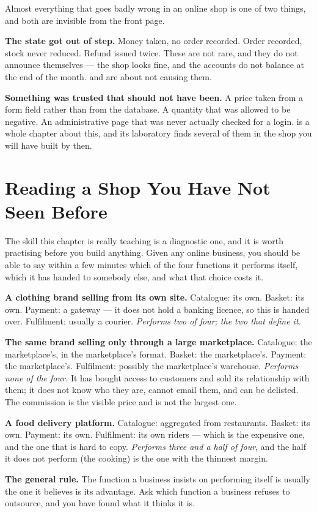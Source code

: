 \begin{alertbox}
Almost everything that goes badly wrong in an online shop is one of two things,
and both are invisible from the front page.

\smallskip
\textbf{The state got out of step.} Money taken, no order recorded. Order
recorded, stock never reduced. Refund issued twice. These are not rare, and they
do not announce themselves --- the shop looks fine, and the accounts do not
balance at the end of the month.  and  are about
not causing them.

\smallskip
\textbf{Something was trusted that should not have been.} A price taken from a
form field rather than from the database. A quantity that was allowed to be
negative. An administrative page that was never actually checked for a login.
 is a whole chapter about this, and its laboratory finds several
of them in the shop you will have built by then.
\end{alertbox}

\section{Reading a Shop You Have Not Seen Before}

The skill this chapter is really teaching is a diagnostic one, and it is worth
practising before you build anything. Given any online business, you should be
able to say within a few minutes which of the four functions it performs itself,
which it has handed to somebody else, and what that choice costs it.

\begin{worked}
\textbf{A clothing brand selling from its own site.}
Catalogue: its own. Basket: its own. Payment: a gateway --- it does not hold a
banking licence, so this is handed over. Fulfilment: usually a courier.
\emph{Performs two of four; the two that define it.}

\smallskip
\textbf{The same brand selling only through a large marketplace.}
Catalogue: the marketplace's, in the marketplace's format. Basket: the
marketplace's. Payment: the marketplace's. Fulfilment: possibly the
marketplace's warehouse. \emph{Performs none of the four.} It has bought
access to customers and sold its relationship with them; it does not know who
they are, cannot email them, and can be delisted. The commission is the
visible price and is not the largest one.

\smallskip
\textbf{A food delivery platform.}
Catalogue: aggregated from restaurants. Basket: its own. Payment: its own.
Fulfilment: its own riders --- which is the expensive one, and the one that is
hard to copy. \emph{Performs three and a half of four}, and the half it does
not perform (the cooking) is the one with the thinnest margin.

\smallskip
\textbf{The general rule.} The function a business insists on performing itself
is usually the one it believes is its advantage. Ask which function a business
refuses to outsource, and you have found what it thinks it is.
\end{worked}

